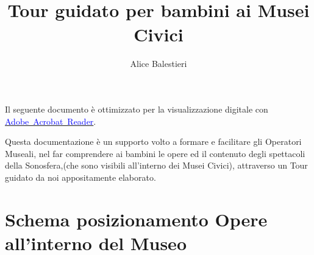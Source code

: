 \documentclass[hidelinks,12pt,a4paper]{article}
\begin{document}
	\begin{flushleft}

		\title{\textbf{\\Tour guidato per bambini ai Musei Civici}}
		\author{Alice Balestieri}
		\date{}

		\maketitle
		
		\begin{adjustwidth}{-30mm}{-30mm}
			\vspace*{\fill}
			\centering
			\fboxrule=2pt
			\fbox
			{
				\begin{minipage}{0.85\linewidth}
					Il seguente documento è ottimizzato per la visualizzazione digitale con \href{https://get.adobe.com/it/reader/}{\textcolor{blue}{Adobe~Acrobat~Reader}}.  
				\end{minipage}
			}
		\end{adjustwidth}
		
		\setcounter{page}{1}
		\newpage
		\tableofcontents
		\newpage
		Questa documentazione è un supporto volto a formare e facilitare gli Operatori Museali, nel far comprendere ai bambini le opere ed il contenuto degli spettacoli della Sonosfera,(che sono visibili all'interno dei Musei Civici), attraverso un Tour guidato da noi appositamente elaborato.
        \newpage
		\section{Schema posizionamento Opere all'interno del Museo}

		\begin{center}
		\end{center}


\end{flushleft}
\end{document}
